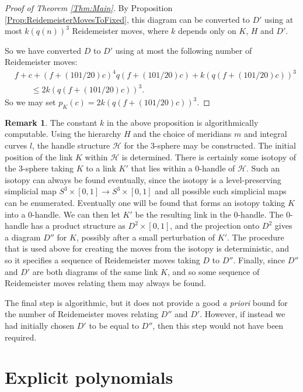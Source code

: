 \documentclass[oneside]{amsart}
\numberwithin{equation}{section}
\theoremstyle{plain}
\theoremstyle{definition}
\newtheorem{remark}[equation]{Remark}
\begin{document}
\begin{proof}[Proof of Theorem \ref{Thm:Main}]
By Proposition \ref{Prop:ReidemeisterMovesToFixed}, this diagram can be converted to $D'$ using
at most $k (q(n))^3$ Reidemeister moves, where $k$ depends only on $K$, $H$ and $D'$.

So we have converted $D$ to $D'$ using at most the following number of Reidemeister moves:
\begin{align*}
& f + c + (f + (101/20)c)^4 q(f + (101/20)c) + k (q(f + (101/20)c))^3 \\
&\qquad \leq 2k (q(f + (101/20)c))^3.
\end{align*}
So we may set $p_K(c) = 2k (q(f + (101/20)c))^3$.
\end{proof}


\begin{remark}
The constant $k$ in the above proposition is algorithmically computable.
Using the hierarchy $H$ and the choice of meridians $m$ and integral curves $l$, the handle structure $\mathcal{H}$ for the 3-sphere may be constructed.
The initial position of the link $K$ within $\mathcal{H}$ is determined. There is certainly
some isotopy of the 3-sphere taking $K$ to a link $K'$ that lies within a 0-handle of $\mathcal{H}$.
Such an isotopy can always be found eventually, since the isotopy is a level-preserving simplicial
map $S^3 \times [0,1] \rightarrow S^3 \times [0,1]$ and all possible such simplicial maps can be enumerated.
Eventually one will be found that forms an isotopy taking $K$ into a 0-handle. We can then
let $K'$ be the resulting link in the 0-handle. The 0-handle has a product structure as $D^2 \times [0,1]$,
and the projection onto $D^2$ gives a diagram $D''$ for $K$, possibly after a small perturbation
of $K'$. The procedure that is used above for 
creating the moves from the isotopy is deterministic, and so it specifies a sequence of
Reidemeister moves taking $D$ to $D''$. Finally, since $D''$ and $D'$ are both diagrams of the
same link $K$, and so some sequence of Reidemeister moves relating them may always be found.

The final step is algorithmic, but it does not provide a good \emph{a priori} bound for the
number of Reidemeister moves relating $D''$ and $D'$. However, if instead we had initially
chosen $D'$ to be equal to $D''$, then this step would not have been required.
\end{remark}

\section{Explicit polynomials}
\label{Sec:Explicit}
\end{document}
